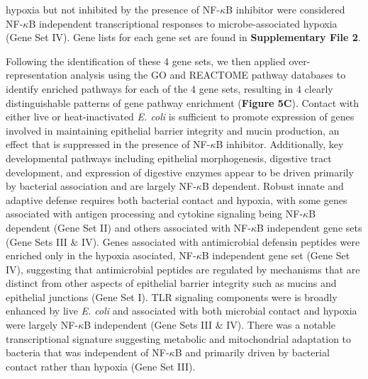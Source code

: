 \documentclass[9pt,lineo]{elife}
\begin{document}
hypoxia but not inhibited by the presence of NF-\(\kappa\)B inhibitor were considered NF-\(\kappa\)B independent transcriptional responses to microbe-associated hypoxia (Gene Set IV). Gene lists for each gene set are found in \textbf{Supplementary File 2}.

Following the identification of these 4 gene sets, we then applied over-representation analysis using the GO and REACTOME pathway databases to identify enriched pathways for each of the 4 gene sets, resulting in 4 clearly distinguishable patterns of gene pathway enrichment (\textbf{Figure 5C}). Contact with either live or heat-inactivated \emph{E. coli} is sufficient to promote expression of genes involved in maintaining epithelial barrier integrity and mucin production, an effect that is suppressed in the presence of NF-\(\kappa\)B inhibitor. Additionally, key developmental pathways including epithelial morphogenesis, digestive tract development, and expression of digestive enzymes appear to be driven primarily by bacterial association and are largely NF-\(\kappa\)B dependent. Robust innate and adaptive defense requires both bacterial contact and hypoxia, with some genes associated with antigen processing and cytokine signaling being NF-\(\kappa\)B dependent (Gene Set II) and others associated with NF-\(\kappa\)B independent gene sets (Gene Sets III \& IV). Genes associated with antimicrobial defensin peptides were enriched only in the hypoxia asociated, NF-\(\kappa\)B independent gene set (Gene Set IV), suggesting that antimicrobial peptides are regulated by mechanisms that are distinct from other aspects of epithelial barrier integrity such as mucins and epithelial junctions (Gene Set I). TLR signaling components were is broadly enhanced by live \emph{E. coli} and associated with both microbial contact and hypoxia were largely NF-\(\kappa\)B independent (Gene Sets III \& IV). There was a notable transcriptional signature suggesting metabolic and mitochondrial adaptation to bacteria that was independent of NF-\(\kappa\)B and primarily driven by bacterial contact rather than hypoxia (Gene Set III).
\end{document}

